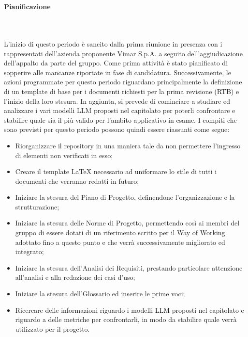 \paragraph{Pianificazione} \hspace{1cm}
\\ \hspace{1cm} \\
L'inizio di questo periodo è sancito dalla prima riunione in presenza con i rappresentati dell'azienda proponente Vimar S.p.A. a seguito dell'aggiudicazione dell'appalto da parte del gruppo. Come prima attività è stato pianificato di sopperire alle mancanze riportate in fase di candidatura. Successivamente, le azioni programmate per questo periodo riguardano principalmente la definizione di un template di base per i documenti richiesti per la prima revisione (RTB) e l'inizio della loro stesura. In aggiunta, si prevede di cominciare a studiare ed analizzare i vari modelli LLM proposti nel capitolato per poterli confrontare e stabilire quale sia il più valido per l'ambito applicativo in esame.
I compiti che sono previsti per questo periodo possono quindi essere riassunti come segue:
\begin{itemize}
    \item Riorganizzare il repository in una maniera tale da non permettere l'ingresso di elementi non verificati in esso;
    \item Creare il template LaTeX necessario ad uniformare lo stile di tutti i documenti che verranno redatti in futuro;
    \item Iniziare la stesura del Piano di Progetto, definendone l'organizzazione e la strutturazione;
    \item Iniziare la stesura delle Norme di Progetto, permettendo così ai membri del gruppo di essere dotati di un riferimento scritto per il Way of Working adottato fino a questo punto e che verrà successivamente migliorato ed integrato;
    \item Iniziare la stesura dell'Analisi dei Requisiti, prestando particolare attenzione all'analisi e alla redazione dei casi d'uso;
    \item Iniziare la stesura dell'Glossario ed inserire le prime voci;
    \item Ricercare delle informazioni riguardo i modelli LLM proposti nel capitolato e riguardo a delle metriche per confrontarli, in modo da stabilire quale verrà utilizzato per il progetto.
\end{itemize}
